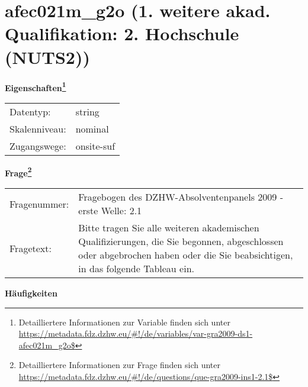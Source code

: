 
    \setcounter{footnote}{0}

    \vspace*{-1.8cm}
	\section{afec021m\_g2o (1. weitere akad. Qualifikation: 2. Hochschule (NUTS2))}
	\label{section:afec021m_g2o}



    \vspace*{0.5cm}
    \noindent\textbf{Eigenschaften\footnote{Detailliertere Informationen zur Variable finden sich unter
		\url{https://metadata.fdz.dzhw.eu/\#!/de/variables/var-gra2009-ds1-afec021m_g2o$}}}\\
	\begin{tabularx}{\hsize}{@{}lX}
	Datentyp: & string \\
	Skalenniveau: & nominal \\
	Zugangswege: &
	  onsite-suf
 \\
    \end{tabularx}



				\vspace*{0.5cm}
                \noindent\textbf{Frage\footnote{Detailliertere Informationen zur Frage finden sich unter
		              \url{https://metadata.fdz.dzhw.eu/\#!/de/questions/que-gra2009-ins1-2.1$}}}\\
				\begin{tabularx}{\hsize}{@{}lX}
					Fragenummer: &
					  Fragebogen des DZHW-Absolventenpanels 2009 - erste Welle:
					  2.1
 \\
					Fragetext: & Bitte tragen Sie alle weiteren akademischen Qualifizierungen, die Sie begonnen, abgeschlossen oder abgebrochen haben oder die Sie beabsichtigen, in das folgende Tableau ein. \\
				\end{tabularx}





        		\vspace*{0.5cm}
                \noindent\textbf{Häufigkeiten}

